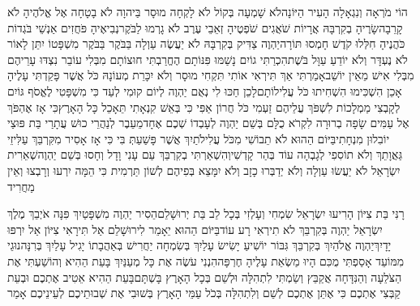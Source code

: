 \documentclass[../main/main.tex]{subfiles}
\begin{document}
\begin{multicols}{\ncols}
הוֹי מֹרְאָה וְנִגְאָלָה הָעִיר הַיּוֹנָה\PreVerseSpace{}לֹא שָׁמְעָה בְּקוֹל לֹא לָקְחָה מוּסָר בַּיהוָה לֹא בָטָחָה אֶל אֱלֹהֶיהָ לֹא קָרֵבָה\PreVerseSpace{}שָׂרֶיהָ בְקִרְבָּהּ אֲרָיוֹת שֹׁאֲגִים שֹׁפְטֶיהָ זְאֵבֵי עֶרֶב לֹא גָרְמוּ לַבֹּקֶר\PreVerseSpace{}נְבִיאֶיהָ פֹּחֲזִים אַנְשֵׁי בֹּגְדוֹת כֹּהֲנֶיהָ חִלְּלוּ קֹדֶשׁ חָמְסוּ תּוֹרָה\PreVerseSpace{}יַהְוֶה צַדִּיק בְּקִרְבָּהּ לֹא יַעֲשֶׂה עַוְלָה בַּבֹּקֶר בַּבֹּקֶר מִשְׁפָּטוֹ יִתֵּן לָאוֹר לֹא נֶעְדָּר וְלֹא יוֹדֵעַ עַוָּל בֹּשֶׁת\PreVerseSpace{}הִכְרַתִּי גוֹיִם נָשַׁמּוּ פִּנּוֹתָם הֶחֱרַבְתִּי חוּצוֹתָם מִבְּלִי עוֹבֵר נִצְדּוּ עָרֵיהֶם מִבְּלִי אִישׁ מֵאֵין יוֹשֵׁב\PreVerseSpace{}אָמַרְתִּי אַךְ תִּירְאִי אוֹתִי תִּקְחִי מוּסָר וְלֹא יִכָּרֵת מְעוֹנָהּ כֹּל אֲשֶׁר פָּקַדְתִּי עָלֶיהָ אָכֵן הִשְׁכִּימוּ הִשְׁחִיתוּ כֹּל עֲלִילוֹתָם\PreVerseSpace{}לָכֵן חַכּוּ לִי נְאֻם יַהְוֶה לְיוֹם קוּמִי לְעַד כִּי מִשְׁפָּטִי לֶאֱסֹף גּוֹיִם לְקָבְצִי מַמְלָכוֹת לִשְׁפֹּךְ עֲלֵיהֶם זַעְמִי כֹּל חֲרוֹן אַפִּי כִּי בְּאֵשׁ קִנְאָתִי תֵּאָכֵל כָּל הָאָרֶץ\PreVerseSpace{}כִּי אָז אֶהְפֹּךְ אֶל עַמִּים שָׂפָה בְרוּרָה לִקְרֹא כֻלָּם בְּשֵׁם יַהְוֶה לְעָבְדוֹ שְׁכֶם אֶחָד\PreVerseSpace{}מֵעֵבֶר לְנַהֲרֵי כוּשׁ עֲתָרַי בַּת פּוּצַי יוֹבִלוּן מִנְחָתִי\PreVerseSpace{}בַּיּוֹם הַהוּא לֹא תֵבוֹשִׁי מִכֹּל עֲלִילֹתַיִךְ אֲשֶׁר פָּשַׁעַתְּ בִּי כִּי אָז אָסִיר מִקִּרְבֵּךְ עַלִּיזֵי גַּאֲוָתֵךְ וְלֹא תוֹסִפִי לְגָבְהָה עוֹד בְּהַר קָדְשִׁי\PreVerseSpace{}וְהִשְׁאַרְתִּי בְקִרְבֵּךְ עַם עָנִי וָדָל וְחָסוּ בְּשֵׁם יַהְוֶה\PreVerseSpace{}שְׁאֵרִית יִשְׂרָאֵל לֹא יַעֲשׂוּ עַוְלָה וְלֹא יְדַבְּרוּ כָזָב וְלֹא יִמָּצֵא בְּפִיהֶם לְשׁוֹן תַּרְמִית כִּי הֵמָּה יִרְעוּ וְרָבְצוּ וְאֵין מַחֲרִיד\OpenSection{}\par
{}רָנִּי בַּת צִיּוֹן הָרִיעוּ יִשְׂרָאֵל שִׂמְחִי וְעָלְזִי בְּכָל לֵב בַּת יְרוּשָׁלֵם\PreVerseSpace{}הֵסִיר יַהְוֶה מִשְׁפָּטַיִךְ פִּנָּה אֹיְבֵךְ מֶלֶךְ יִשְׂרָאֵל יַהְוֶה בְּקִרְבֵּךְ לֹא תִירְאִי רָע עוֹד\PreVerseSpace{}בַּיּוֹם הַהוּא יֵאָמֵר לִירוּשָׁלֵם אַל תִּירָאִי צִיּוֹן אַל יִרְפּוּ יָדָיִךְ\PreVerseSpace{}יַהְוֶה אֱלֹהַיִךְ בְּקִרְבֵּךְ גִּבּוֹר יוֹשִׁיעַ יָשִׂישׂ עָלַיִךְ בְּשִׂמְחָה יַחֲרִישׁ בְּאַהֲבָתוֹ יָגִיל עָלַיִךְ בְּרִנָּה\PreVerseSpace{}נוּגֵי מִמּוֹעֵד אָסַפְתִּי מֻכִּם\SubEnd{} הָיוּ מַשְׂאֵת עָלֶיהָ חֶרְפָּה\PreVerseSpace{}הִנְנִי עֹשֶׂה אֶת כָּל מְעַנַּיִךְ בָּעֵת הַהִיא וְהוֹשַׁעְתִּי אֶת הַצֹּלֵעָה וְהַנִּדָּחָה אֲקַבֵּץ וְשַׂמְתִּי\SubEnd{} לִתְהִלָּה וּלְשֵׁם בְּכָל הָאָרֶץ בָּשְׁתָּם\PreVerseSpace{}בָּעֵת הַהִיא אֵטִיב\SubEnd{} אֶתְכֶם וּבְעֵת\SubEnd{} קַבְּצִי אֶתְכֶם כִּי אֶתֵּן אֶתְכֶם לְשֵׁם וְלִתְהִלָּה בְּכֹל עַמֵּי הָאָרֶץ בְּשׁוּבִי אֶת שְׁבוּתֵיכֶם לְעֵינֵיכֶם אָמַר \par
\pagebreak
\end{multicols}
\end{document}
